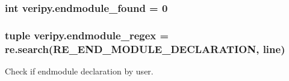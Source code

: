 \hypertarget{namespaceveripy_a3ba39ef01b3512b93ff8c35da72555c3}{
\subsubsection[{endmodule\-\_\-found}]{\setlength{\rightskip}{0pt plus 5cm}int veripy.\-endmodule\-\_\-found = 0}}\label{namespaceveripy_a3ba39ef01b3512b93ff8c35da72555c3}
\hypertarget{namespaceveripy_ac385a661e564ea21a74143edbc147bb9}{
\subsubsection[{endmodule\-\_\-regex}]{\setlength{\rightskip}{0pt plus 5cm}tuple veripy.\-endmodule\-\_\-regex = re.\-search(R\-E\-\_\-\-E\-N\-D\-\_\-\-M\-O\-D\-U\-L\-E\-\_\-\-D\-E\-C\-L\-A\-R\-A\-T\-I\-O\-N, {\bf line})}}\label{namespaceveripy_ac385a661e564ea21a74143edbc147bb9}


Check if endmodule declaration by user. 

